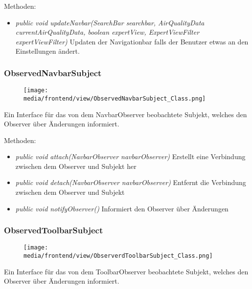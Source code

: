 Methoden:
\begin{itemize} 
    \item \emph{public void updateNavbar(SearchBar searchbar, AirQualityData currentAirQualityData,
    boolean expertView, ExpertViewFilter expertViewFilter)} Updaten der Navigationbar falls der Benutzer etwas an den Einstellungen ändert.
\end{itemize}

\subsubsection{ObservedNavbarSubject}
\begin{minipage}{0.3\textwidth}
    \begin{figure}[H]
        \texttt{[image: media/frontend/view/ObservedNavbarSubject\_Class.png]}
    \end{figure}
    \end{minipage} \hfill
    \begin{minipage}{0.6\textwidth}
Ein Interface für das von dem NavbarObserver beobachtete Subjekt, welches den Observer über Änderungen informiert.
\end{minipage}

Methoden:
\begin{itemize} 
    \item \emph{public void attach(NavbarObserver navbarObserver)} Erstellt eine Verbindung zwischen dem Observer und Subjekt her
    \item \emph{public void detach(NavbarObserver navbarObserver)} Entfernt die Verbindung zwischen dem Observer und Subjekt
    \item \emph{public void notifyObserver()} Informiert den Observer über Änderungen
\end{itemize}

\subsubsection{ObservedToolbarSubject}
\begin{minipage}{0.3\textwidth}
    \begin{figure}[H]
        \texttt{[image: media/frontend/view/ObserverdToolbarSubject\_Class.png]}
    \end{figure}
    \end{minipage} \hfill
    \begin{minipage}{0.6\textwidth}
Ein Interface für das von dem ToolbarObserver beobachtete Subjekt, welches den Observer über Änderungen informiert.
\end{minipage}

